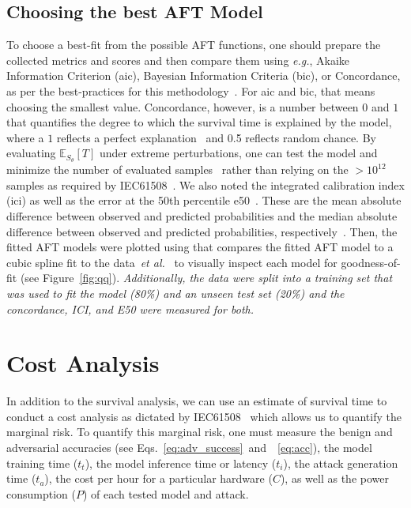 \documentclass[conference]{IEEEtran}
\newcommand{\cm}[1]{\textit{{\color{blue}#1}}}
\begin{document}
\subsection{Choosing the best AFT Model}
\label{best-fit}
To choose a best-fit from the possible AFT functions, one should prepare the collected metrics and scores and then compare them using \textit{e.g.}, Akaike Information Criterion (\acrshort{aic}), Bayesian Information Criteria (\acrshort{bic}), or Concordance, as per the best-practices for this methodology~\cite{aft_models,kleinbaum1996survival}. 
For \acrshort{aic} and \acrshort{bic}, that means choosing the smallest value. Concordance, however, is a number between $0$ and $1$ that quantifies the degree to which the survival time is explained by the model, where a $1$ reflects a perfect explanation~\cite{kleinbaum1996survival} and 0.5 reflects random chance. By evaluating $\mathbb{E}_{S_\theta}[T]$ under extreme perturbations, one can test the model and minimize the number of evaluated samples~\cite{aft_models,kleinbaum1996survival} rather than relying on the $> 10^{12}$ samples as required by IEC61508~\cite{IEC61508}. 
We also noted the integrated calibration index (\acrshort{ici}) as well as the error at the 50th percentile \acrshort{e50}~\cite{ici}. 
These are the mean absolute difference between observed and predicted probabilities and the median absolute difference between observed and predicted probabilities, respectively~\cite{ici}. 
Then, the fitted AFT models were plotted using that compares the fitted AFT model to a cubic spline fit to the data~\textit{et al.}~\cite{ici}  to visually inspect each model for goodness-of-fit (see Figure~\ref{fig:qq}). \cm{Additionally, the data were split into a training set that was used to fit the model (80\%) and an unseen test set (20\%) and the concordance, ICI, and E50 were measured for both.}






\section{Cost Analysis}
\label{cost}

In addition to the survival analysis, we can use an estimate of survival time to conduct a cost analysis as dictated by IEC61508~\cite{IEC61508} which allows us to quantify the marginal risk. To quantify this marginal risk, one must measure the benign and adversarial accuracies (see Eqs.~\ref{eq:adv_success}~and~~\ref{eq:acc}), the model training time ($t_{t}$), the model inference time or latency ($t_{i}$), the attack generation time ($t_{a}$), the cost per hour for a particular hardware ($C$), as well as the power consumption ($P$) of each tested model and attack. 
\end{document}

